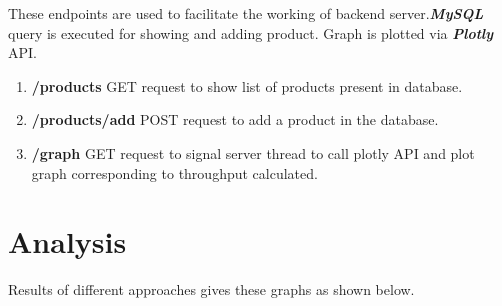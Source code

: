 \documentclass[11pt]{article}
\begin{document}
These endpoints are used to facilitate the working of backend server.\textbf{\textit{MySQL}} query is executed for showing and adding product. Graph is plotted via \textbf{\textit{Plotly}} API.
\begin{enumerate}
    \item \textbf{/products} GET request to show list of products present in database.
    \item \textbf{/products/add} POST request to add a product in the database.
    \item \textbf{/graph} GET request to signal server thread to call plotly API and plot graph corresponding to throughput calculated.
\end{enumerate}

\section{Analysis}\label{analysis}
Results of different approaches gives these graphs as shown below.
\end{document}

